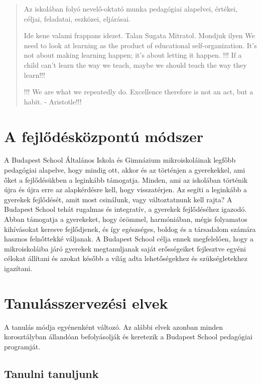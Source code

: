 \begin{quote}
      Az iskolában folyó nevelő-oktató munka pedagógiai alapelvei, értékei,
      céljai,
      feladatai, eszközei, eljárásai.

      Ide kene valami frappans idezet. Talan Sugata Mitratol. Mondjuk ilyen We
      need
      to look at learning as the product of educational self-organization. It’s
      not
      about making learning happen; it’s about letting it happen.
      !!! If a child can't learn the way we teach, maybe we should teach the
      way
      they learn!!!

      !!! We are what we repeatedly do. Excellence therefore is not an act, but
      a
      habit. - Aristotle!!!

\end{quote}


\section{A fejlődésközpontú módszer}
A Budapest School Általános Iskola és Gimnázium mikroiskoláinak legfőbb
pedagógiai alapelve, hogy mindig ott, akkor és az történjen a
gyerekekkel, ami őket a fejlődésükben a leginkább támogatja. Minden, ami
az iskolában történik újra és újra erre az alapkérdésre kell, hogy
visszatérjen. Az segíti a leginkább a gyerekek fejlődését, amit most
csinálunk, vagy változtatnunk kell rajta? A Budapest School
tehát rugalmas és integratív, a gyerekek fejlődéséhez igazodó. Abban
támogatja a gyerekeket, hogy örömmel, harmóniában, mégis folyamatos
kihívásokat keresve fejlődjenek, és így egészséges, boldog és a
társadalom számára hasznos felnőttekké váljanak. A Budapest School
célja ennek megfelelően, hogy a mikroiskoláiba járó gyerekek
megtanuljanak saját erősségeiket fejlesztve egyéni célokat állítani és
azokat később a  világ adta lehetőségekhez és szükségletekhez
igazítani.

\section{Tanulásszervezési elvek}
\label{sec:tanulasszervezesi_elvek}

A tanulás módja egyénenként változó. Az alábbi elvek azonban minden
korosztályban állandóan befolyásolják és keretezik a Budapest School
pedagógiai programját.


\subsection{Tanulni tanuljunk}


